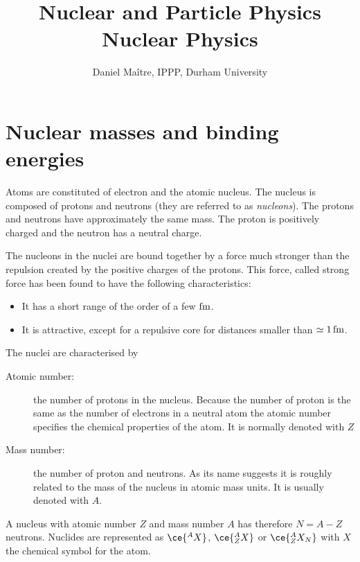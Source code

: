 \documentclass[12pt]{article}
\date{}
\title{\LARGE \bf Nuclear and Particle Physics\\[5mm]Nuclear Physics}
\author{Daniel Ma\^{i}tre, IPPP, Durham University}
\begin{document}
\maketitle
\clearpage
%
%
%
%

\section{Nuclear masses and binding energies}
%
%
%
%
%
%
Atoms are constituted of electron and the atomic nucleus. The nucleus is composed of protons and neutrons (they are referred to as \emph{nucleons}). The protons and neutrons have approximately the same mass. The proton is positively charged and the neutron has a neutral charge.


The nucleons in the nuclei are bound together by a force much stronger than the repulsion created by the positive charges of the protons. This force, called strong force has been found to have the following characteristics: 
\begin{itemize}
\item It has a short range of the order of a few $\rm fm$.
\item It is attractive, except for a repulsive core for distances smaller than $\simeq 1\,\rm fm$. 
\end{itemize}  

The nuclei are characterised by
\begin{description} 
\item[Atomic number:] the number of protons in the nucleus. Because the number of proton is the same as the number of electrons in a neutral atom the atomic number specifies the chemical properties of the atom. It is normally denoted with $Z$   
\item[Mass number:] the number of proton and neutrons. As its name suggests it is roughly related to the mass of the nucleus in atomic mass units. It is usually denoted with $A$.
\end{description}



A nucleus with atomic number $Z$ and mass number $A$ has therefore $N=A-Z$ neutrons. Nuclides are represented as $\ce{^{A} X}$, $\ce{^{A}_{Z}X}$ or $\ce{^{A}_{Z}X_{N}}$ with $X$ the chemical symbol for the atom. 
\end{document}
